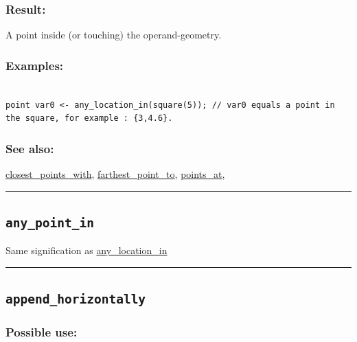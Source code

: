 \documentclass[]{book}
\theoremstyle{definition}
\theoremstyle{definition}
\theoremstyle{definition}
\theoremstyle{remark}
\begin{document}
\subsubsection{Result:}\label{result-37}

A point inside (or touching) the operand-geometry.

\subsubsection{Examples:}\label{examples-30}

\begin{verbatim}
 
point var0 <- any_location_in(square(5)); // var0 equals a point in the square, for example : {3,4.6}.
\end{verbatim}

\subsubsection{See also:}\label{see-also-26}

\href{operators-b-to-c.html\#closest_points_with}{closest\_points\_with},
\href{operators-d-to-h.html\#farthest_point_to}{farthest\_point\_to},
\href{operators-n-to-r.html\#points_at}{points\_at},

\begin{center}\rule{0.5\linewidth}{\linethickness}\end{center}

\subsection{\texorpdfstring{\texttt{any\_point\_in}}{any\_point\_in}}\label{any_point_in}

Same signification as
\href{operators-a-to-a.html\#any_location_in}{any\_location\_in}

\begin{center}\rule{0.5\linewidth}{\linethickness}\end{center}

\subsection{\texorpdfstring{\texttt{append\_horizontally}}{append\_horizontally}}\label{append_horizontally}

\subsubsection{Possible use:}\label{possible-use-39}
\end{document}
